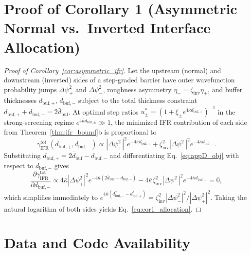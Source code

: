 \documentclass[11pt,letterpaper]{article}
\begin{document}
\section{Proof of Corollary 1 (Asymmetric Normal vs.\ Inverted Interface Allocation)}
\label{app:asymmetric_ifr}

\begin{proof}[Proof of Corollary~\ref{cor:asymmetric_ifr}]
Let the upstream (normal) and downstream (inverted) sides of a step-graded barrier have outer wavefunction probability jumps $\Delta\psi_+^2$ and $\Delta\psi_-^2$, roughness asymmetry $\eta_- = \zeta_{\mathrm{inv}}\eta_+$, and buffer thicknesses $d_{\mathrm{buf,+}}$, $d_{\mathrm{buf,-}}$ subject to the total thickness constraint $d_{\mathrm{buf,+}} + d_{\mathrm{buf,-}} = 2\bar{d}_{\mathrm{buf}}$. At optimal step ratios $u_\pm^* = (1 + \xi_\pm e^{4\bar{\kappa} d_{\mathrm{buf,\pm}}})^{-1}$ in the strong-screening regime $e^{4\bar{\kappa} d_{\mathrm{buf,\pm}}} \gg 1$, the minimized IFR contribution of each side from Theorem~\ref{thm:ifr_bound}b is proportional to
\begin{equation}
\gamma_{\mathrm{IFR}}^{\mathrm{tot}}(d_{\mathrm{buf,+}}, d_{\mathrm{buf,-}}) \propto |\Delta\psi_+^2|^2 e^{-4\bar{\kappa} d_{\mathrm{buf,+}}} + \zeta_{\mathrm{inv}}^2 |\Delta\psi_-^2|^2 e^{-4\bar{\kappa} d_{\mathrm{buf,-}}}.
\label{eq:appD_obj}
\end{equation}
Substituting $d_{\mathrm{buf,+}} = 2\bar{d}_{\mathrm{buf}} - d_{\mathrm{buf,-}}$ and differentiating Eq.~\eqref{eq:appD_obj} with respect to $d_{\mathrm{buf,-}}$ gives
\begin{equation}
\frac{\partial \gamma_{\mathrm{IFR}}^{\mathrm{tot}}}{\partial d_{\mathrm{buf,-}}} \propto 4\bar{\kappa}|\Delta\psi_+^2|^2 e^{-4\bar{\kappa}(2\bar{d}_{\mathrm{buf}} - d_{\mathrm{buf,-}})} - 4\bar{\kappa}\zeta_{\mathrm{inv}}^2 |\Delta\psi_-^2|^2 e^{-4\bar{\kappa} d_{\mathrm{buf,-}}} = 0,
\label{eq:appD_deriv}
\end{equation}
which simplifies immediately to $e^{4\bar{\kappa}(d_{\mathrm{buf,-}}^* - d_{\mathrm{buf,+}}^*)} = \zeta_{\mathrm{inv}}^2 |\Delta\psi_-^2|^2 / |\Delta\psi_+^2|^2$. Taking the natural logarithm of both sides yields Eq.~\eqref{eq:cor1_allocation}.
\end{proof}

\section*{Data and Code Availability}
\end{document}
